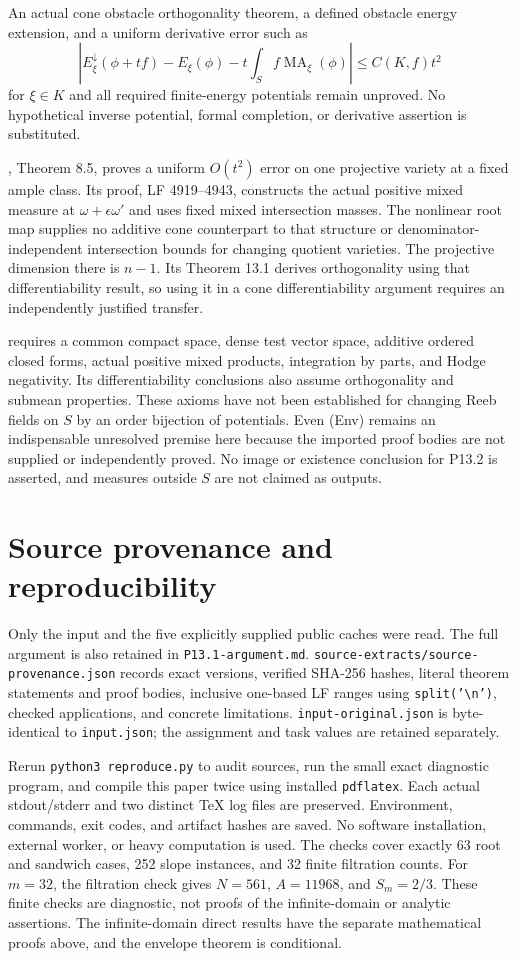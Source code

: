 \documentclass[11pt]{article}
\newcommand{\MA}{\operatorname{MA}}
\begin{document}
An actual cone obstacle orthogonality theorem, a defined obstacle energy extension, and a uniform derivative error such as
\[
 \left|E_\xi^\downarrow(\phi+tf)-E_\xi(\phi)
   -t\int_Sf\MA_\xi(\phi)\right|\leq C(K,f)t^2
\]
for $\xi\in K$ and all required finite-energy potentials remain unproved.
No hypothetical inverse potential, formal completion, or derivative assertion is substituted.

\cite{BJ22}, Theorem 8.5, proves a uniform $O(t^2)$ error on one projective variety at a fixed ample class.
Its proof, LF 4919--4943, constructs the actual positive mixed measure at $\omega+\epsilon\omega'$ and uses fixed mixed intersection masses.
The nonlinear root map supplies no additive cone counterpart to that structure or denominator-independent intersection bounds for changing quotient varieties.
The projective dimension there is $n-1$.
Its Theorem 13.1 derives orthogonality using that differentiability result, so using it in a cone differentiability argument requires an independently justified transfer.

\cite{BJ23} requires a common compact space, dense test vector space, additive ordered closed forms, actual positive mixed products, integration by parts, and Hodge negativity.
Its differentiability conclusions also assume orthogonality and submean properties.
These axioms have not been established for changing Reeb fields on $S$ by an order bijection of potentials.
Even (Env) remains an indispensable unresolved premise here because the imported proof bodies are not supplied or independently proved.
No image or existence conclusion for P13.2 is asserted, and measures outside $S$ are not claimed as outputs.

\section{Source provenance and reproducibility}
Only the input and the five explicitly supplied public caches were read.
The full argument is also retained in \texttt{P13.1-argument.md}.
\texttt{source-extracts/source-provenance.json} records exact versions, verified SHA-256 hashes, literal theorem statements and proof bodies, inclusive one-based LF ranges using \texttt{split('\textbackslash n')}, checked applications, and concrete limitations.
\texttt{input-original.json} is byte-identical to \texttt{input.json}; the assignment and task values are retained separately.

Rerun \texttt{python3 reproduce.py} to audit sources, run the small exact diagnostic program, and compile this paper twice using installed \texttt{pdflatex}.
Each actual stdout/stderr and two distinct TeX log files are preserved.
Environment, commands, exit codes, and artifact hashes are saved.
No software installation, external worker, or heavy computation is used.
The checks cover exactly 63 root and sandwich cases, 252 slope instances, and 32 finite filtration counts.
For $m=32$, the filtration check gives $N=561$, $A=11968$, and $S_m=2/3$.
These finite checks are diagnostic, not proofs of the infinite-domain or analytic assertions.
The infinite-domain direct results have the separate mathematical proofs above, and the envelope theorem is conditional.
\end{document}
